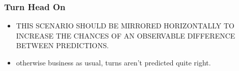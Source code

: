 \subsubsection{Turn Head On}
\begin{itemize}
    \item THIS SCENARIO SHOULD BE MIRRORED HORIZONTALLY TO INCREASE THE CHANCES OF AN OBSERVABLE DIFFERENCE BETWEEN PREDICTIONS.
    \item otherwise business as usual, turns aren't predicted quite right.
\end{itemize}
\clearpage
